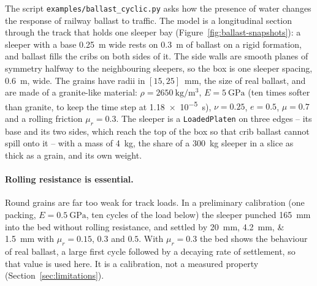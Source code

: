 The script \texttt{examples/ballast\_cyclic.py} asks how the presence of water
changes the response of railway ballast to traffic.  The model is a
longitudinal section through the track that holds one sleeper bay
(Figure~\ref{fig:ballast-snapshots}): a sleeper with a base
\qty{0.25}{\metre} wide rests on \qty{0.3}{\metre} of ballast on a rigid
formation, and ballast fills the cribs on both sides of it.  The side walls are
smooth planes of symmetry halfway to the neighbouring sleepers, so the box is
one sleeper spacing, \qty{0.6}{\metre}, wide.  The grains have radii in
$[15,25]$~\unit{\milli\metre}, the size of real ballast, and are made of a
granite-like material: $\rho=\qty{2650}{\kilogram\per\cubic\metre}$,
$E=\qty{5}{\giga\pascal}$ (ten times softer than granite, to keep the time
step at \qty{1.18e-5}{\second}), $\nu=0.25$, $e=0.5$, $\mu=0.7$ and a rolling
friction $\mu_{r}=0.3$.  The sleeper is a \texttt{LoadedPlaten} on three edges
-- its base and its two sides, which reach the top of the box so that crib
ballast cannot spill onto it -- with a mass of \qty{4}{\kilogram}, the share of
a \qty{300}{\kilogram} sleeper in a slice as thick as a grain, and its own
weight.

\paragraph{Rolling resistance is essential.}  Round grains are far too weak for
track loads.  In a preliminary calibration (one packing, $E=\qty{0.5}{\giga\pascal}$,
ten cycles of the load below) the sleeper punched \qty{165}{\milli\metre} into
the bed without rolling resistance, and settled by \qtylist{20;4.2;1.5}{\milli\metre}
with $\mu_{r}=0.15$, $0.3$ and $0.5$.  With $\mu_{r}=0.3$ the bed shows the
behaviour of real ballast, a large first cycle followed by a decaying rate of
settlement, so that value is used here.  It is a calibration, not a measured
property (Section~\ref{sec:limitations}).

